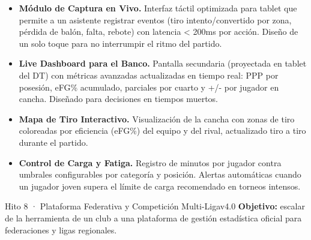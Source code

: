 \documentclass[11pt,a4paper]{article}
\begin{document}
\begin{itemize}
  \item \textbf{Módulo de Captura en Vivo.} Interfaz táctil optimizada para tablet que permite a un asistente registrar eventos (tiro intento/convertido por zona, pérdida de balón, falta, rebote) con latencia < 200ms por acción. Diseño de un solo toque para no interrumpir el ritmo del partido.

  \item \textbf{Live Dashboard para el Banco.} Pantalla secundaria (proyectada en tablet del DT) con métricas avanzadas actualizadas en tiempo real: PPP por posesión, eFG\% acumulado, parciales por cuarto y +/- por jugador en cancha. Diseñado para decisiones en tiempos muertos.

  \item \textbf{Mapa de Tiro Interactivo.} Visualización de la cancha con zonas de tiro coloreadas por eficiencia (eFG\%) del equipo y del rival, actualizado tiro a tiro durante el partido.

  \item \textbf{Control de Carga y Fatiga.} Registro de minutos por jugador contra umbrales configurables por categoría y posición. Alertas automáticas cuando un jugador joven supera el límite de carga recomendado en torneos intensos.
\end{itemize}

\begin{roadbox}{Hito 8 · Plataforma Federativa y Competición Multi-Liga}{v4.0}
\small\textcolor{accentlight}{%
  \textbf{Objetivo:} escalar de la herramienta de un club a una plataforma de gestión estadística oficial para federaciones y ligas regionales.
}
\end{roadbox}
\end{document}
